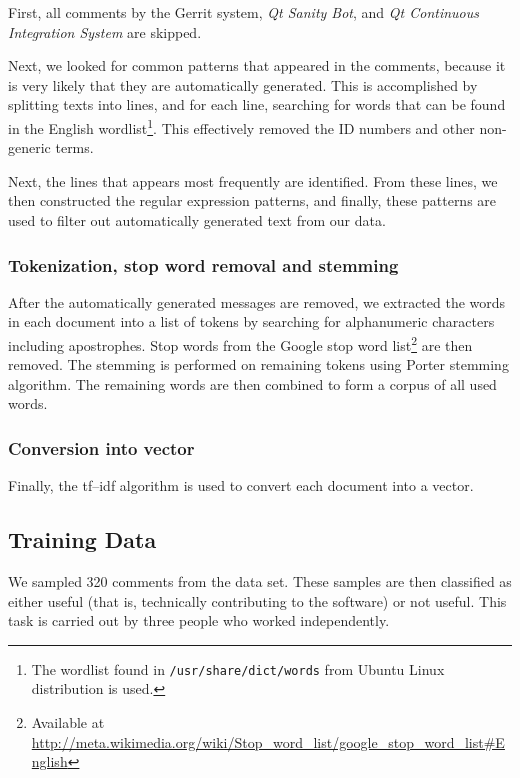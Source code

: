 \documentclass[conference]{IEEEtran}
\begin{document}
First, all comments by the Gerrit system, \emph{Qt Sanity Bot}, and \emph{Qt Continuous Integration System} are skipped.

Next, we looked for common patterns that appeared in the comments, because it is very likely that they are automatically generated.
This is accomplished by splitting texts into lines, and for each line, searching for words that can be found in the English wordlist\footnote{The wordlist found in \texttt{/usr/share/dict/words} from Ubuntu Linux distribution is used.}.
This effectively removed the ID numbers and other non-generic terms.

Next, the lines that appears most frequently are identified.
From these lines, we then constructed the regular expression patterns,
and finally, these patterns are used to filter out automatically generated text from our data.



\subsubsection{Tokenization, stop word removal and stemming}

After the automatically generated messages are removed, we extracted the words in each document into a list of tokens by searching for alphanumeric characters including apostrophes.
Stop words from the Google stop word list\footnote{Available at \url{http://meta.wikimedia.org/wiki/Stop_word_list/google_stop_word_list#English}} are then removed.
The stemming is performed on remaining tokens using Porter stemming algorithm.
The remaining words are then combined to form a corpus of all used words.



\subsubsection{Conversion into vector}

Finally, the tf--idf algorithm is used to convert each document into a vector.





\subsection{Training Data}

We sampled 320 comments from the data set.
These samples are then classified as either useful (that is, technically contributing to the software) or not useful.
This task is carried out by three people who worked independently.
\end{document}
